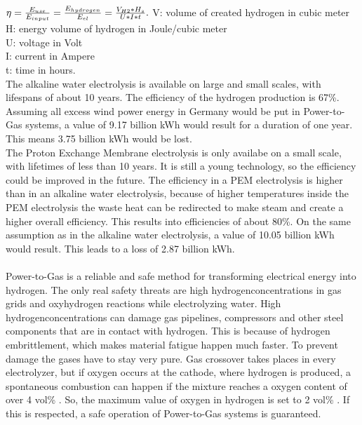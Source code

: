 \begin{parcolumns}[colwidths={1=2.5 cm, 2=10 cm, 3=2.5 cm}]{3}
{\begin{math}
\eta = \frac{E_{use}}{E_{input}} = \frac{E_{hydrogen}}{E_{el}} = \frac{V_{H2}* H_{s}}{U*I*t}. \\
\end{math}
V: volume of created hydrogen in cubic meter\\
H: energy volume of hydrogen in Joule/cubic meter\\
U: voltage in Volt\\
I: current in Ampere\\
t: time in hours. 
\\
The alkaline water electrolysis is available on large and small scales, with lifespans of about 10 years. The efficiency of the hydrogen production is 67\%. Assuming all excess wind power energy in Germany would be put in Power-to-Gas systems, a value of 9.17 billion kWh would result for a duration of one year. This means 3.75 billion kWh would be lost. 
\\
The Proton Exchange Membrane electrolysis is only availabe on a small scale, with lifetimes of less than 10 years. It is still a young technology, so the efficiency could be improved in the future. The efficiency in a PEM electrolysis is higher than in an alkaline water electrolysis, because of higher temperatures inside the PEM electrolysis the waste heat can be redirected to make steam and create a higher overall efficiency. This results into efficiencies of about 80\%. On the same assumption as in the alkaline water electrolysis, a value of 10.05 billion kWh would result. This leads to a loss of 2.87 billion kWh. 
\\ \\
Power-to-Gas is a reliable and safe method for transforming electrical energy into hydrogen. The only real safety threats are high hydrogenconcentrations in gas grids and oxyhydrogen reactions while electrolyzing water. High hydrogenconcentrations can damage gas pipelines, compressors and other steel components that are in contact with hydrogen. This is because of hydrogen embrittlement, which makes material fatigue happen much faster. To prevent damage the gases have to stay very pure. Gas crossover takes places in every electrolyzer, but if oxygen occurs at the cathode, where hydrogen is produced, a spontaneous combustion can happen if the mixture reaches a oxygen content of over 4 vol\% . So, the maximum value of oxygen in hydrogen is set to 2 vol\% . If this is respected, a safe operation of Power-to-Gas systems is guaranteed.
\\ \\
}
\end{parcolumns}
